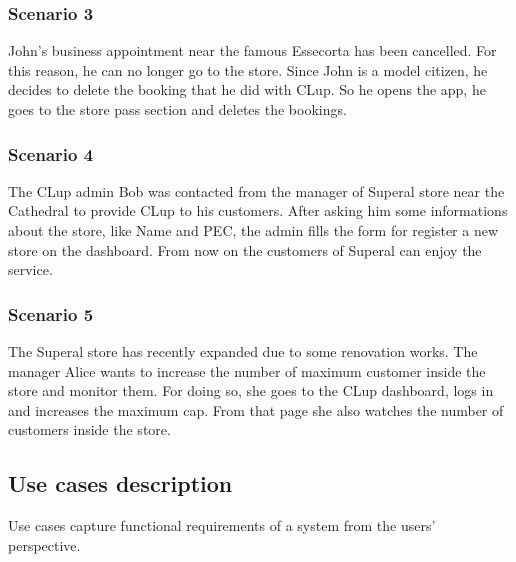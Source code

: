 		\subsubsection{Scenario 3}
		John's business appointment near the famous Essecorta has been cancelled. For this reason, he can no longer go to the store.\newline
		Since John is a model citizen, he decides to delete the booking that he did with CLup. So he opens the app, he goes to the store pass section and deletes the bookings.
		\subsubsection{Scenario 4}
		The CLup admin Bob was contacted from the manager of Superal store near the Cathedral to provide CLup to his customers. After asking him some informations about the store, like Name and PEC, the admin fills the form for register a new store on the dashboard. From now on the customers of Superal can enjoy the service.
		\subsubsection{Scenario 5}
		The Superal store has recently expanded due to some renovation works. The manager Alice wants to increase the number of maximum customer inside the store and monitor them.\newline
		For doing so, she goes to the CLup dashboard, logs in and increases the maximum cap. From that page she also watches the number of customers inside the store.

	\clearpage
    \subsection{Use cases description}
    Use cases capture functional requirements of a system from the users' perspective.

